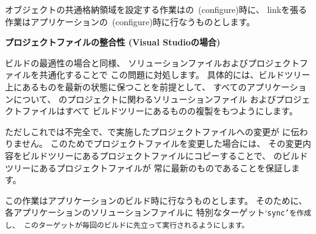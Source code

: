 \begin{narrow}[20pt]
	\medskip
	オブジェクトの共通格納領域を設定する作業は\SprLib の\cmake\ (configure)時に、
	linkを張る作業はアプリケーションの\cmake\ (configure)時に行なうものとします。
\end{narrow}

\medskip
\bf{プロジェクトファイルの整合性 (Visual Studioの場合)}
\begin{narrow}[20pt]
	ビルドの最適性の場合と同様、
	ソリューションファイルおよびプロジェクトファイルを共通化することで
	この問題に対処します。
	具体的には、\SprLib ビルドツリー上にあるものを最新の状態に保つことを前提として、
	すべてのアプリケーションについて、
	\SprLib のプロジェクトに関わるソリューションファイル
	およびプロジェクトファイルはすべて
	\SprLib ビルドツリーにあるものの複製をもつようにします。

	\medskip
	ただしこれでは不完全で、で実施したプロジェクトファイルへの変更が
	に伝わりません。
	このためでプロジェクトファイルを変更した場合には、
	その変更内容を\SprLib ビルドツリーにあるプロジェクトファイルにコピーすることで、
	\SprLib のビルドツリーにあるプロジェクトファイルが
	常に最新のものであることを保証します。

	\medskip
	この作業はアプリケーションのビルド時に行なうものとします。
	そのために、各アプリケーションのソリューションファイルに
	特別なターゲット`\tt{sync}'を作成し、
	このターゲットが毎回のビルドに先立って実行されるようにします。


\end{narrow}
